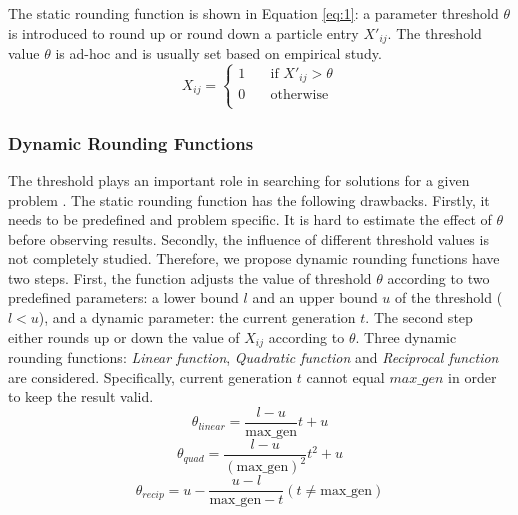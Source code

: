 \documentclass[10pt,journal,compsoc]{IEEEtran}
\begin{document}
The static rounding function is shown in Equation \ref{eq:1}: a parameter threshold $\theta$ is introduced to round up or round down a particle entry $X'_{ij}$.
The threshold value $\theta$ is ad-hoc and is usually set based on empirical study.
 \begin{equation}
  \label{eq:1}
  X_{ij} =
  \begin{cases}
   1 & \quad \text{if } X'_{ij} > \theta \\
   0 & \quad \text{otherwise} \\
  \end{cases}
 \end{equation}
\vspace{-5 mm}

\subsubsection{Dynamic Rounding Functions}
\label{sec:dynamic}
The threshold plays an important role in searching for solutions for a given problem \cite{Tan2016a}. The static rounding function has the following drawbacks. Firstly, it needs to be predefined and problem specific. It is hard to estimate the effect of $\theta$ before observing results. Secondly, the influence of different threshold values is not completely studied. Therefore, we propose dynamic rounding functions have two steps. First, the function adjusts the value of threshold $\theta$ according to two predefined parameters: a lower bound $l$ and an upper bound $u$ of the threshold ($l < u$), and a dynamic parameter: the current generation $t$. The second step either rounds up or down the value of $X_{ij}$ according to $\theta$. Three dynamic rounding functions: \emph{Linear function}, \emph{Quadratic function} and \emph{Reciprocal function} are considered. Specifically, current generation $t$ cannot equal $max\_gen$ in order to keep the result valid. 
\vspace{-3 mm}
\begin{equation}
\label{eq:linear}
 \theta_{linear} = \frac{l - u}{\text{max\_gen}} t + u
\end{equation}
\begin{equation}
\label{eq:quadratic}
 \theta_{quad} = \frac{l - u}{(\text{max\_gen})^2} t^2 + u
\end{equation}
\begin{equation}
\label{eq:reciprocal}
 \theta_{recip} = u - \frac{u - l}{\text{max\_gen} - t}  (t \neq \text{max\_gen})
\end{equation}
\end{document}
